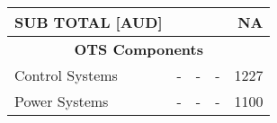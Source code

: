 \begin{table}[h]
{\begin{tabular}{|l|l|l|l|r|}
\textbf{SUB TOTAL {[}AUD{]}}                                 & \multicolumn{4}{r|}{NA}                                                                                                                                   \\ \hline
\multicolumn{5}{|c|}{\textbf{OTS Components}}                                                                                                                                                                  \\ \hline
\multirow{4}{*}{Control Systems}                   & \multirow{4}{*}{-}                 & \multirow{4}{*}{-}                   & \multirow{4}{*}{-}            & \multirow{4}{*}{1227}                         \\
                                                   &                                    &                                      &                               &                                               \\
                                                   &                                    &                                      &                               &                                               \\
                                                   &                                    &                                      &                               &                                               \\ \hline
\multirow{3}{*}{Power Systems}                     & \multirow{3}{*}{-}                 & \multirow{3}{*}{-}                   & \multirow{3}{*}{-}            & \multirow{3}{*}{1100}                         \\
                                                   &                                    &                                      &                               &                                               \\
                                                   &                                    &                                      &                               &                                               \\ \hline
                                                  

\end{tabular}}
\end{table}
